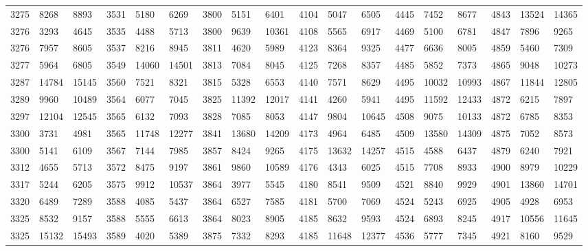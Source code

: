 \begin{center}
\begin{longtable}{*5{A@{\hspace*{5mm}}A}}
3275&8268&8893&3531&5180&6269&3800&5151&6401&4104&5047&6505&4445&7452&8677&4843&13524&14365\\
3276&3293&4645&3535&4488&5713&3800&9639&10361&4108&5565&6917&4469&5100&6781&4847&7896&9265\\
3276&7957&8605&3537&8216&8945&3811&4620&5989&4123&8364&9325&4477&6636&8005&4859&5460&7309\\
3277&5964&6805&3549&14060&14501&3813&7084&8045&4125&7268&8357&4485&5852&7373&4865&9048&10273\\
3287&14784&15145&3560&7521&8321&3815&5328&6553&4140&7571&8629&4495&10032&10993&4867&11844&12805\\
3289&9960&10489&3564&6077&7045&3825&11392&12017&4141&4260&5941&4495&11592&12433&4872&6215&7897\\
3297&12104&12545&3565&6132&7093&3828&7085&8053&4147&9804&10645&4508&9075&10133&4872&6785&8353\\
3300&3731&4981&3565&11748&12277&3841&13680&14209&4173&4964&6485&4509&13580&14309&4875&7052&8573\\
3300&5141&6109&3567&7144&7985&3857&8424&9265&4175&13632&14257&4515&4588&6437&4879&6240&7921\\
3312&4655&5713&3572&8475&9197&3861&9860&10589&4176&4343&6025&4515&7708&8933&4900&8979&10229\\
3317&5244&6205&3575&9912&10537&3864&3977&5545&4180&8541&9509&4521&8840&9929&4901&13860&14701\\
3320&6489&7289&3588&4085&5437&3864&6527&7585&4181&5700&7069&4524&5243&6925&4905&4928&6953\\
3325&8532&9157&3588&5555&6613&3864&8023&8905&4185&8632&9593&4524&6893&8245&4917&10556&11645\\
3325&15132&15493&3589&4020&5389&3875&7332&8293&4185&11648&12377&4536&5777&7345&4921&8160&9529\\
\end{longtable}
\end{center}
\newpage
